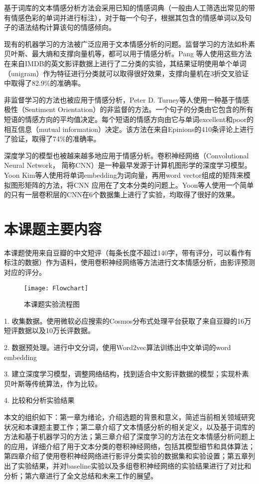 基于词库的文本情感分析方法会采用已知的情感词典（一般由人工筛选出常见的带有情感色彩的单词并进行标注），对于每一个句子，根据其包含的情感单词以及句子的语法结构计算该句的情感倾向\cite{taboada.2011.lexicon}。

现有的机器学习的方法被广泛应用于文本情感分析的问题。监督学习的方法如朴素贝叶斯、最大熵和支撑向量机等，都可以用于情感分析。Pang 等人使用这些方法在来自IMDB的英文影评数据上进行了二分类的实验，其结果证明使用单个单词（unigram）作为特征进行分类就可以取得很好效果，支撑向量机在3折交叉验证中取得了82.9\%的准确率\cite{Pang.2002.ml}。

非监督学习的方法也被应用于情感分析，Peter D. Turney等人使用一种基于情感极性（Sentiment Orientation）的非监督的方法\cite{turney.2002.thumbs}。一个句子的分类由它包含的所有短语的情感方向的平均值决定。每个短语的情感方向由它与单词excellent和poor的相互信息（mutual information）决定。该方法在来自Epinions的410条评论上进行了验证，取得了74\%的准确率。

深度学习的模型也被越来越多地应用于情感分析。卷积神经网络（Convolutional Neural Network， 简称CNN）是一种最早发源于计算机图形学的深度学习模型。Yoon Kim等人使用将单词embedding为词向量，再用word vector组成的矩阵来模拟图形矩阵的方法，将CNN 应用在了文本分类的问题上\cite{kim.2014.convolutional}。Yoon等人使用一个简单的只有一层卷积层的CNN在6个数据集上进行了实验，均取得了很好的效果。

\section{本课题主要内容}
本课题使用来自豆瓣的中文短评（每条长度不超过140字，带有评分，可以看作有标注的数据）作为语料，使用卷积神经网络等方法进行文本情感分析，由影评预测对应的评分。

\begin{figure}[ht]
\centering
\texttt{[image: Flowchart]}
\caption{本课题实验流程图} \label{fig:Flowchart}
\end{figure}


1.	收集数据。使用微软必应搜索的Cosmos分布式处理平台获取了来自豆瓣的16万短评数据以及10万长评数据。

2.	数据预处理。进行中文分词，使用Word2vec算法训练出中文单词的word embedding

3.	建立深度学习模型，调整网络结构，找到适合中文影评数据的模型；实现朴素贝叶斯等传统算法，作为比较。

4.	比较和分析实验结果

本文的组织如下：第一章为绪论，介绍选题的背景和意义，简述当前相关领域研究状况和本课题主要工作；第二章介绍了文本情感分析的相关定义，以及基于词库的方法和基于机器学习的方法；第三章介绍了深度学习的方法在文本情感分析问题上的应用，详细介绍了用于文本分类的卷积神经网络，包括其模型细节和具体算法；第四章介绍了使用卷积神经网络进行影评分类实验的数据集和实验设置；第五章列出了实验结果，并对baseline实验以及多组卷积神经网络的实验结果进行了对比和分析；第六章进行了全文总结和未来工作的展望。
